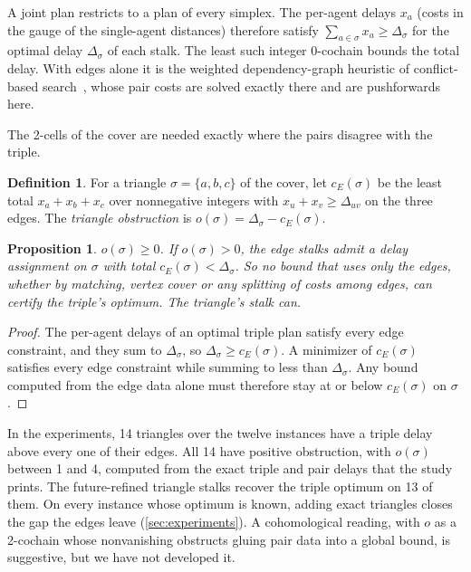 \documentclass[11pt]{article}
\newtheorem{proposition}[theorem]{Proposition}
\theoremstyle{definition}
\newtheorem{definition}[theorem]{Definition}
\theoremstyle{remark}
\begin{document}
A joint plan restricts to a plan of every simplex. The per-agent delays $x_a$
(costs in the gauge of the single-agent distances) therefore satisfy
$\sum_{a \in \sigma} x_a \ge \Delta_\sigma$ for the optimal delay $\Delta_\sigma$
of each stalk. The least such integer $0$-cochain bounds the total delay. With
edges alone it is the weighted dependency-graph heuristic of conflict-based
search~\cite{li2019}, whose pair costs are solved exactly there and are
pushforwards here.

The 2-cells of the cover are needed exactly where the pairs disagree with the
triple.

\begin{definition}
For a triangle $\sigma = \{a,b,c\}$ of the cover, let $c_E(\sigma)$ be the least total
$x_a + x_b + x_c$ over nonnegative integers with $x_u + x_v \ge \Delta_{uv}$ on the
three edges. The \emph{triangle obstruction} is $o(\sigma) = \Delta_\sigma - c_E(\sigma)$.
\end{definition}

\begin{proposition}\label{prop:obstruction}
$o(\sigma) \ge 0$. If $o(\sigma) > 0$, the edge stalks admit a delay assignment
on $\sigma$ with total $c_E(\sigma) < \Delta_\sigma$. So no bound that uses only
the edges, whether by matching, vertex cover or any splitting of costs among
edges, can certify the triple's optimum. The triangle's stalk can.
\end{proposition}
\begin{proof}
The per-agent delays of an optimal triple plan satisfy every edge constraint, and
they sum to $\Delta_\sigma$, so $\Delta_\sigma \ge c_E(\sigma)$. A minimizer of
$c_E(\sigma)$ satisfies every edge constraint while summing to less than
$\Delta_\sigma$. Any bound computed from the edge data alone must therefore stay
at or below $c_E(\sigma)$ on $\sigma$.
\end{proof}

In the experiments, 14 triangles over the twelve instances have a triple delay
above every one of their edges. All 14 have positive obstruction, with
$o(\sigma)$ between 1 and 4, computed from the exact triple and pair delays that
the study prints. The future-refined triangle stalks recover the triple optimum on
13 of them. On every instance whose optimum is known, adding exact triangles closes
the gap the edges leave (\cref{sec:experiments}). A cohomological reading, with $o$ as a 2-cochain whose
nonvanishing obstructs gluing pair data into a global bound, is suggestive, but we
have not developed it.
\end{document}
